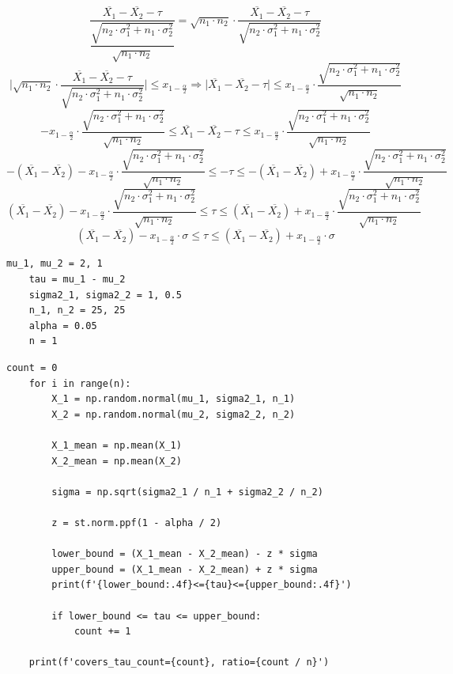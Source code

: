 \documentclass[a4paper, 12pt]{article}
\begin{document}
    $$\dfrac{\overline{X_1}-\overline{X_2}-\tau}{\dfrac{\sqrt{n_2\cdot\sigma_1^2+n_1\cdot\sigma_2^2}}{\sqrt{n_1\cdot n_2}}}=\sqrt{n_1\cdot n_2}\cdot\dfrac{\overline{X_1}-\overline{X_2}-\tau}{\sqrt{n_2\cdot\sigma_1^2+n_1\cdot\sigma_2^2}}$$
    $$\Bigg|\sqrt{n_1\cdot n_2}\cdot\dfrac{\overline{X_1}-\overline{X_2}-\tau}{\sqrt{n_2\cdot\sigma_1^2+n_1\cdot\sigma_2^2}}\Bigg|\leq x_{1-\frac{\alpha}{2}}\Rightarrow
    \Bigg|\overline{X_1}-\overline{X_2}-\tau\Bigg|\leq x_{1-\frac{\alpha}{2}}\cdot\dfrac{\sqrt{n_2\cdot\sigma_1^2+n_1\cdot\sigma_2^2}}{\sqrt{n_1\cdot n_2}}$$
    $$-x_{1-\frac{\alpha}{2}}\cdot\dfrac{\sqrt{n_2\cdot\sigma_1^2+n_1\cdot\sigma_2^2}}{\sqrt{n_1\cdot n_2}}\leq\overline{X_1}-\overline{X_2}-\tau\leq x_{1-\frac{\alpha}{2}}\cdot\dfrac{\sqrt{n_2\cdot\sigma_1^2+n_1\cdot\sigma_2^2}}{\sqrt{n_1\cdot n_2}}$$
    $$-\left(\overline{X_1}-\overline{X_2}\right)-x_{1-\frac{\alpha}{2}}\cdot\dfrac{\sqrt{n_2\cdot\sigma_1^2+n_1\cdot\sigma_2^2}}{\sqrt{n_1\cdot n_2}}\leq-\tau\leq -\left(\overline{X_1}-\overline{X_2}\right)+x_{1-\frac{\alpha}{2}}\cdot\dfrac{\sqrt{n_2\cdot\sigma_1^2+n_1\cdot\sigma_2^2}}{\sqrt{n_1\cdot n_2}}$$
    $$\left(\overline{X_1}-\overline{X_2}\right)-x_{1-\frac{\alpha}{2}}\cdot\dfrac{\sqrt{n_2\cdot\sigma_1^2+n_1\cdot\sigma_2^2}}{\sqrt{n_1\cdot n_2}}\leq\tau\leq \left(\overline{X_1}-\overline{X_2}\right)+x_{1-\frac{\alpha}{2}}\cdot\dfrac{\sqrt{n_2\cdot\sigma_1^2+n_1\cdot\sigma_2^2}}{\sqrt{n_1\cdot n_2}}$$
    $$\left(\overline{X_1}-\overline{X_2}\right)-x_{1-\frac{\alpha}{2}}\cdot\sigma\leq\tau\leq \left(\overline{X_1}-\overline{X_2}\right)+x_{1-\frac{\alpha}{2}}\cdot\sigma$$


    \begin{lstlisting}[label=vars, caption={Задаем данные по условию}]
    mu_1, mu_2 = 2, 1
    tau = mu_1 - mu_2
    sigma2_1, sigma2_2 = 1, 0.5
    n_1, n_2 = 25, 25
    alpha = 0.05
    n = 1
    \end{lstlisting}


    \begin{lstlisting}[label=code1, caption={Код для подсчета доверительного интервала и кол-во попаданий}]
    count = 0
    for i in range(n):
        X_1 = np.random.normal(mu_1, sigma2_1, n_1)
        X_2 = np.random.normal(mu_2, sigma2_2, n_2)
        
        X_1_mean = np.mean(X_1)
        X_2_mean = np.mean(X_2)
        
        sigma = np.sqrt(sigma2_1 / n_1 + sigma2_2 / n_2)
        
        z = st.norm.ppf(1 - alpha / 2)
        
        lower_bound = (X_1_mean - X_2_mean) - z * sigma
        upper_bound = (X_1_mean - X_2_mean) + z * sigma
        print(f'{lower_bound:.4f}<={tau}<={upper_bound:.4f}')
            
        if lower_bound <= tau <= upper_bound:
            count += 1
        
    print(f'covers_tau_count={count}, ratio={count / n}')
    \end{lstlisting}
\end{document}
